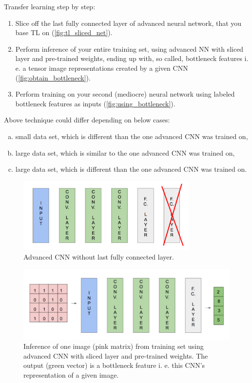 \documentclass[11pt]{article}
\begin{document}
Transfer learning step by step:
\begin{enumerate}[1)]
\item Slice off the last fully connected layer of advanced neural network, that you base TL on (\autoref{fig:tl_sliced_net}).
\item Perform inference of your entire training set, using advanced NN with sliced layer and pre-trained weights, ending up with, so called, bottleneck features i. e. a tensor image representations created by a given CNN (\autoref{fig:obtain_bottleneck}).
\item Perform training on your second (mediocre) neural network using labeled bottleneck features as inputs (\autoref{fig:using_bottleneck}).
\end{enumerate}
Above technique could differ depending on below cases:
\begin{enumerate}[a)]
\item small data set, which is different than the one advanced CNN was trained on,
\item large data set, which is similar to the one advanced CNN was trained on,
\item large data set, which is different than the one advanced CNN was trained on.
\end{enumerate}

\begin{figure}[h]
\includegraphics[width=0.8\textwidth]{tl_sliced_net}
\centering
\caption{Advanced CNN without last fully connected layer.}
\label{fig:tl_sliced_net}
\end{figure}

\begin{figure}[h]
\includegraphics[width=\textwidth]{obtain_bottleneck}
\centering
\caption{Inference of one image (pink matrix) from training set using advanced CNN with sliced layer and pre-trained weights. The output (green vector) is a bottleneck feature i. e. this CNN's representation of a given image.}
\label{fig:obtain_bottleneck}
\end{figure}
\end{document}
